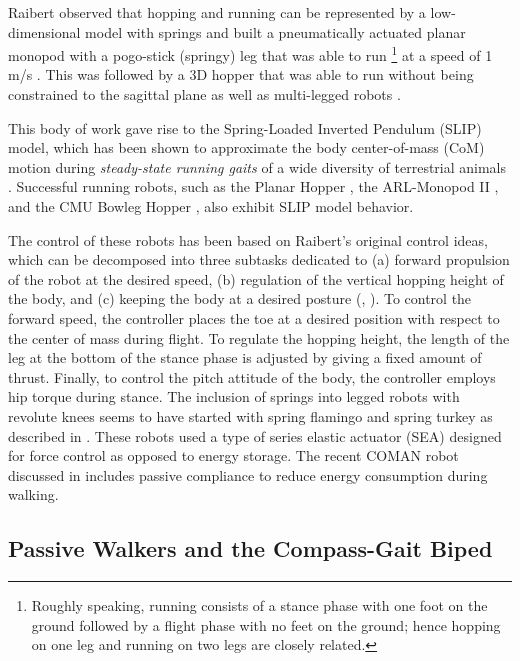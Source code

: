 Raibert observed that hopping and running can be represented by a
low-dimensional model with springs and built a pneumatically actuated planar
monopod with a pogo-stick (springy) leg that was able to run%
%
\footnote{Roughly speaking, running consists of a stance phase with one foot on
  the ground followed by a flight phase with no feet on the ground;
  hence hopping on one leg and running on two legs are closely related.}\xspace
%
at a speed of 1 m/s \cite{Raibert1984, Raibert1986, Raibert1984a}.
%
This was followed by a 3D hopper that was able to run without being constrained
to the sagittal plane \cite[Chap.~3]{Raibert1986} as well as multi-legged robots
\cite{Hodgins1991, Raibert1990, Raibert1986a}.
%

This body of work gave rise to the Spring-Loaded Inverted Pendulum (SLIP) model,
which has been shown to approximate the body center-of-mass (CoM) motion during
\textit{steady-state running gaits} of a wide diversity of terrestrial animals
\cite{Blickhan1989, Mcmahon1990, Farley1993, Full2000, Dickinson2000,
  Seyfarth2002}.
%
Successful running robots, such as the Planar Hopper \cite{Raibert1986},
the ARL-Monopod II \cite{Ahmadi2006}, and the CMU Bowleg Hopper
\cite{Zeglin1998}, also exhibit SLIP model behavior.
%

The control of these robots has been based on Raibert's original control ideas,
which can be decomposed into three subtasks dedicated to (a) forward propulsion
of the robot at the desired speed, (b) regulation of the vertical hopping height
of the body, and (c) keeping the body at a desired posture (\cite{Raibert1984},
\cite[Ch. 2]{Raibert1986}).
%
To control the forward speed, the controller places the toe at a desired
position with respect to the center of mass during flight.
%
To regulate the hopping height, the length of the leg at the bottom of the
stance phase is adjusted by giving a fixed amount of thrust.
%
Finally, to control the pitch attitude of the body, the controller employs hip
torque during stance.
%
The inclusion of springs into legged robots with revolute knees seems to have
started with spring flamingo and spring turkey as described in
\cite{Hollerbach1992, Pratt1999, Pratt2000, Pratt2001}.
%
These robots used a type of series elastic actuator (SEA) designed for force
control as opposed to energy storage.
%
The recent COMAN robot discussed in \cite{Li2013} includes passive
compliance to reduce energy consumption during walking.


\subsection{Passive Walkers and the Compass-Gait Biped} \label{sec:literature-passive-walkers}

